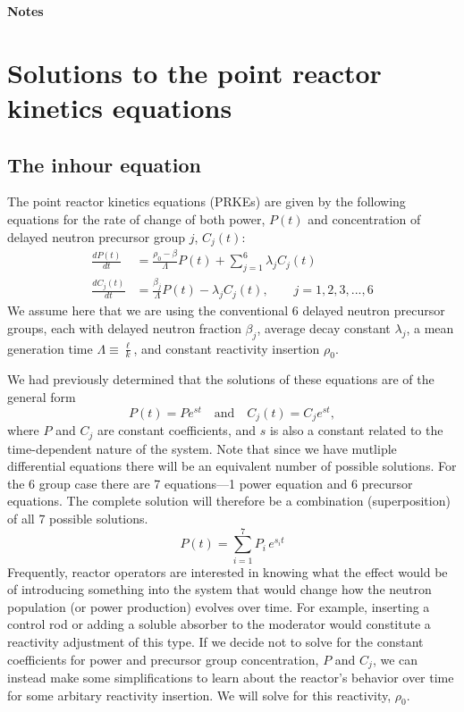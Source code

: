 \documentclass{report}
\begin{document}
\thispagestyle{FirstPage}
\begin{center}
\textbf{\large Notes}
\end{center}




\section*{Solutions to the point reactor kinetics equations} 

\subsection*{The inhour equation}

The point reactor kinetics equations (PRKEs) are given by the following equations for the rate of change of both power, $P(t)$ and concentration of delayed neutron precursor group $j$, $C_j(t)$:
\begin{align*}
\frac{dP(t)}{dt}	&= \frac{\rho_0 - \beta}{\Lambda} P(t) + \sum_{j=1}^6 \lambda_j C_j(t) \\
\frac{dC_j(t)}{dt}	&= \frac{\beta_j}{\Lambda} P(t) - \lambda_j C_j(t) , \qquad j= 1,2,3,...,6 
\end{align*}
We assume here that we are using the conventional 6 delayed neutron precursor groups, each with delayed neutron fraction $\beta_j$, average decay constant $\lambda_j$, a mean generation time $\Lambda \equiv \frac{\ell}{k}$, and constant reactivity insertion $\rho_0$.

We had previously determined that the solutions of these equations are of the general form 
$$ P(t) = Pe^{st} \quad\text{and}\quad C_j(t) = C_je^{st} ,$$
where $P$ and $C_j$ are constant coefficients, and $s$ is also a constant related to the time-dependent nature of the system. Note that since we have mutliple differential equations there will be an equivalent number of possible solutions. For the 6 group case there are 7 equations---1 power equation and 6 precursor equations. The complete solution will therefore be a combination (superposition) of all 7 possible solutions.
$$ P(t) = \sum_{i=1}^7 P_i \, e^{s_i t} $$
Frequently, reactor operators are interested in knowing what the effect would be of introducing something into the system that would change how the neutron population (or power production) evolves over time. For example, inserting a control rod or adding a soluble absorber to the moderator would constitute a reactivity adjustment of this type. If we decide not to solve for the constant coefficients for power and precursor group concentration, $P$ and $C_j$, we can instead make some simplifications to learn about the reactor's behavior over time for some arbitary reactivity insertion. We will solve for this reactivity, $\rho_0$. 
\end{document}
